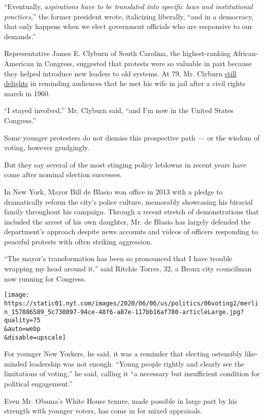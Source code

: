 ``Eventually, \emph{aspirations have to be translated into specific laws
and institutional practices},'' the former president wrote, italicizing
liberally, ``and in a democracy, that only happens when we elect
government officials who are responsive to our demands.''

Representative James E. Clyburn of South Carolina, the highest-ranking
African-American in Congress, suggested that protests were so valuable
in part because they helped introduce new leaders to old systems. At 79,
Mr. Clyburn
\href{https://www.washingtonpost.com/history/2020/01/10/clyburn-recounts-1960-meet-cute-with-his-future-wife-jail/}{still
delights} in reminding audiences that he met his wife in jail after a
civil rights march in 1960.

``I stayed involved,'' Mr. Clyburn said, ``and I'm now in the United
States Congress.''

Some younger protesters do not dismiss this prospective path --- or the
wisdom of voting, however grudgingly.

But they say several of the most stinging policy letdowns in recent
years have come after nominal election successes.

In New York, Mayor Bill de Blasio won office in 2013 with a pledge to
dramatically reform the city's police culture, memorably showcasing his
biracial family throughout his campaign. Through a recent stretch of
demonstrations that included the arrest of his own daughter, Mr. de
Blasio has largely defended the department's approach despite news
accounts and videos of officers responding to peaceful protests with
often striking aggression.

``The mayor's transformation has been so pronounced that I have trouble
wrapping my head around it,'' said Ritchie Torres, 32, a Bronx city
councilman now running for Congress.

\texttt{[image: https://static01.nyt.com/images/2020/06/06/us/politics/06voting2/merlin\_157886589\_5c730897-94ce-48f6-a87e-117bb16af780-articleLarge.jpg?quality=75\\\&auto=webp\\\&disable=upscale]}

For younger New Yorkers, he said, it was a reminder that electing
ostensibly like-minded leadership was not enough. ``Young people rightly
and clearly see the limitations of voting,'' he said, calling it ``a
necessary but insufficient condition for political engagement.''

Even Mr. Obama's White House tenure, made possible in large part by his
strength with younger voters, has come in for mixed appraisals.

